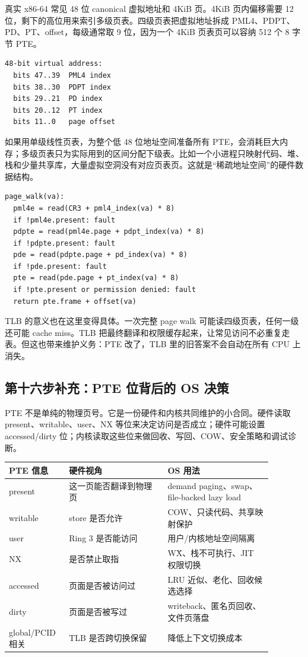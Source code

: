 真实 x86-64 常见 48 位 canonical 虚拟地址和 4KiB 页。4KiB 页内偏移需要 12 位，剩下的高位用来索引多级页表。四级页表把虚拟地址拆成 PML4、PDPT、PD、PT、offset，每级通常取 9 位，因为一个 4KiB 页表页可以容纳 512 个 8 字节 PTE。

\begin{lstlisting}
48-bit virtual address:
  bits 47..39  PML4 index
  bits 38..30  PDPT index
  bits 29..21  PD index
  bits 20..12  PT index
  bits 11..0   page offset
\end{lstlisting}

如果用单级线性页表，为整个低 48 位地址空间准备所有 PTE，会消耗巨大内存；多级页表只为实际用到的区间分配下级表。比如一个小进程只映射代码、堆、栈和少量共享库，大量虚拟空洞没有对应页表页。这就是“稀疏地址空间”的硬件数据结构。

\begin{lstlisting}
page_walk(va):
  pml4e = read(CR3 + pml4_index(va) * 8)
  if !pml4e.present: fault
  pdpte = read(pml4e.page + pdpt_index(va) * 8)
  if !pdpte.present: fault
  pde = read(pdpte.page + pd_index(va) * 8)
  if !pde.present: fault
  pte = read(pde.page + pt_index(va) * 8)
  if !pte.present or permission denied: fault
  return pte.frame + offset(va)
\end{lstlisting}

TLB 的意义也在这里变得具体。一次完整 page walk 可能读四级页表，任何一级还可能 cache miss。TLB 把最终翻译和权限缓存起来，让常见访问不必重复走表。但这也带来维护义务：PTE 改了，TLB 里的旧答案不会自动在所有 CPU 上消失。

\subsection{第十六步补充：PTE 位背后的 OS 决策}

PTE 不是单纯的物理页号。它是一份硬件和内核共同维护的小合同。硬件读取 present、writable、user、NX 等位来决定访问是否成立；硬件可能设置 accessed/dirty 位；内核读取这些位来做回收、写回、COW、安全策略和调试诊断。

\begin{longtable}{p{0.18\linewidth}p{0.34\linewidth}p{0.36\linewidth}}
\toprule
PTE 信息 & 硬件视角 & OS 用法 \\
\midrule
present & 这一页能否翻译到物理页 & demand paging、swap、file-backed lazy load \\
writable & store 是否允许 & COW、只读代码、共享映射保护 \\
user & Ring 3 是否能访问 & 用户/内核地址空间隔离 \\
NX & 是否禁止取指 & W\^X、栈不可执行、JIT 权限切换 \\
accessed & 页面是否被访问过 & LRU 近似、老化、回收候选选择 \\
dirty & 页面是否被写过 & writeback、匿名页回收、文件页落盘 \\
global/PCID 相关 & TLB 是否跨切换保留 & 降低上下文切换成本 \\
\bottomrule
\end{longtable}

